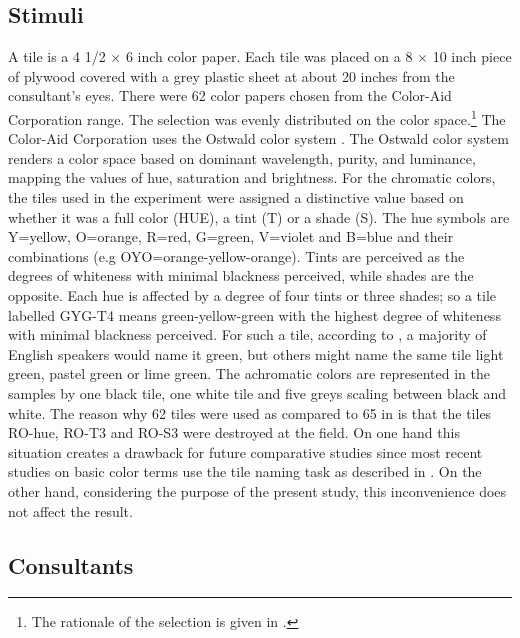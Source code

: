 \subsection{Stimuli}
\label{sec:stimuli}

A tile is a 4 1/2  $\times$  6 inch color paper. Each tile was placed on a  8 
$\times$  10 inch piece of plywood covered with a grey plastic sheet at about
20 inches from the consultant's eyes.  There were 62 color papers chosen from
the
Color-Aid Corporation range. The selection was evenly distributed on the color
space.\footnote{The rationale of the selection is given in
\citet[1097]{Davi92}.}  The Color-Aid Corporation uses the Ostwald color
system \citep{Ostw39, Pacl83}. The Ostwald color system renders a color space
based on dominant wavelength, purity, and luminance, mapping the values of hue,
saturation and brightness. For the chromatic colors, the tiles used in the
experiment were assigned a distinctive value based on whether it was a full
color
(HUE), a tint (T) or a shade (S). The hue symbols are Y=yellow, O=orange, R=red,
G=green, V=violet and B=blue and their combinations (e.g
OYO=orange-yellow-orange). Tints are perceived as the degrees of whiteness with
minimal blackness perceived, while shades are the opposite. Each hue is
affected
by a degree of four tints or three shades; so a tile labelled GYG-T4 means
green-yellow-green with the highest degree of whiteness with minimal blackness
perceived. For such a tile, according to \citet[34]{Davi95}, a majority of
English speakers would name it green, but others might name the same  tile
light green,
pastel green or lime green.  The achromatic colors are represented in the 
samples by one black tile, one white tile and five greys scaling between black
and white. The reason why 62 tiles were used as compared to 65 in \cite{Davi95}
is that the tiles RO-hue, RO-T3 and RO-S3 were destroyed at the field. On one
hand
this situation creates a drawback for future comparative studies since most
recent studies on basic color terms use the tile naming task as described in
\cite{Davi95}. On the other hand,  considering the purpose of the present
study, this inconvenience does not affect the result.
 

\subsection{Consultants}
\label{sec:consultants}

